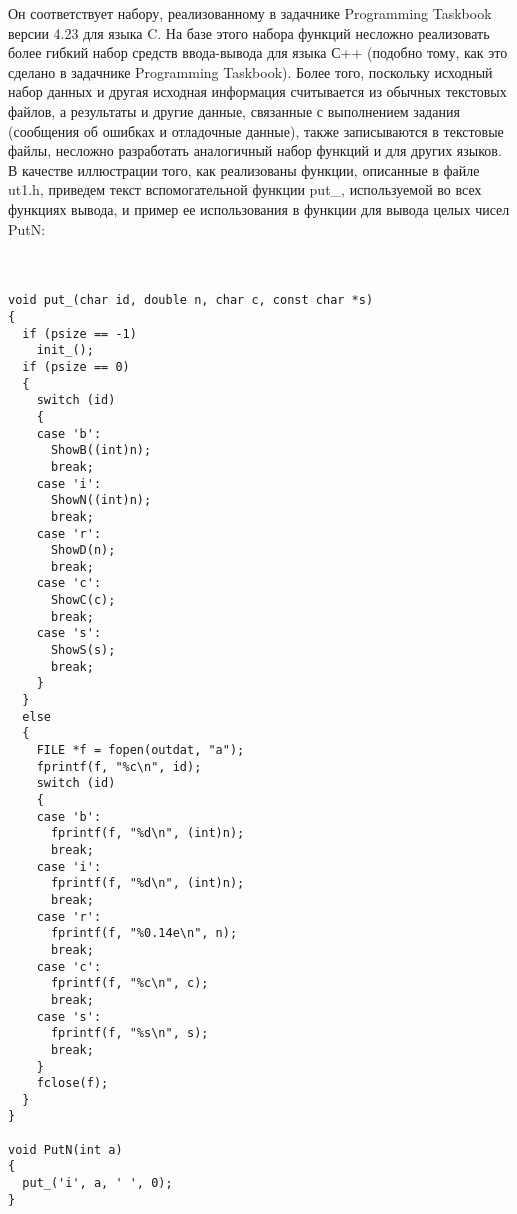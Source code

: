 Он соответствует набору, реализованному в задачнике Programming Taskbook версии 4.23 для языка C. На базе этого набора функций несложно реализовать более гибкий набор средств ввода-вывода для языка С++ (подобно тому, как это сделано в задачнике Programming Taskbook). Более того, поскольку исходный набор данных и другая исходная информация считывается из обычных текстовых файлов, а результаты и другие данные, связанные с выполнением задания (сообщения об ошибках и отладочные данные), также записываются в текстовые файлы, несложно разработать аналогичный набор функций и для других языков.
В качестве иллюстрации того, как реализованы функции, описанные в файле ut1.h, приведем текст вспомогательной функции put\_, используемой во всех функциях вывода, и пример ее использования в функции для вывода целых чисел PutN:
\\ \\ \\
\lstset{language=c++}
\begin{lstlisting}
void put_(char id, double n, char c, const char *s)
{
  if (psize == -1)
    init_();
  if (psize == 0)
  {
    switch (id)
    {
    case 'b':
      ShowB((int)n);
      break;
    case 'i':
      ShowN((int)n);
      break;
    case 'r':
      ShowD(n);
      break;
    case 'c':
      ShowC(c);
      break;
    case 's':
      ShowS(s);
      break;
    }
  }
  else
  {
    FILE *f = fopen(outdat, "a");
    fprintf(f, "%c\n", id);
    switch (id)
    {
    case 'b':
      fprintf(f, "%d\n", (int)n);
      break;
    case 'i':
      fprintf(f, "%d\n", (int)n);
      break;
    case 'r':
      fprintf(f, "%0.14e\n", n);
      break;
    case 'c':
      fprintf(f, "%c\n", c);
      break;
    case 's':
      fprintf(f, "%s\n", s);
      break;
    }
    fclose(f);
  }
}

void PutN(int a)
{
  put_('i', a, ' ', 0);
}

\end{lstlisting}

